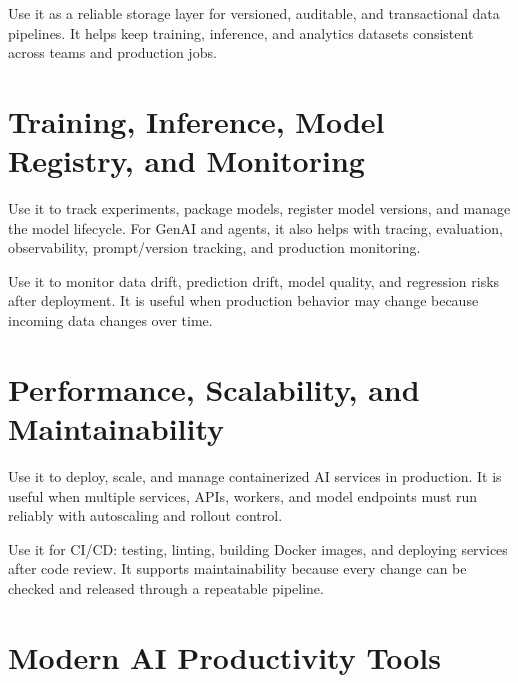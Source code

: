 \documentclass[a4paper]{article}
\begin{document}
\begin{tcolorbox}[title={Delta Lake}]
Use it as a reliable storage layer for versioned, auditable, and transactional data pipelines.
It helps keep training, inference, and analytics datasets consistent across teams and production jobs.
\end{tcolorbox}

\section{Training, Inference, Model Registry, and Monitoring}

\begin{tcolorbox}[title={MLflow}]
Use it to track experiments, package models, register model versions, and manage the model lifecycle.
For GenAI and agents, it also helps with tracing, evaluation, observability, prompt/version tracking, and production monitoring.
\end{tcolorbox}

\begin{tcolorbox}[title={Evidently AI}]
Use it to monitor data drift, prediction drift, model quality, and regression risks after deployment.
It is useful when production behavior may change because incoming data changes over time.
\end{tcolorbox}

\section{Performance, Scalability, and Maintainability}

\begin{tcolorbox}[title={Kubernetes / Azure Kubernetes Service}]
Use it to deploy, scale, and manage containerized AI services in production.
It is useful when multiple services, APIs, workers, and model endpoints must run reliably with autoscaling and rollout control.
\end{tcolorbox}

\begin{tcolorbox}[title={GitHub Actions}]
Use it for CI/CD: testing, linting, building Docker images, and deploying services after code review.
It supports maintainability because every change can be checked and released through a repeatable pipeline.
\end{tcolorbox}

\section{Modern AI Productivity Tools}
\end{document}
